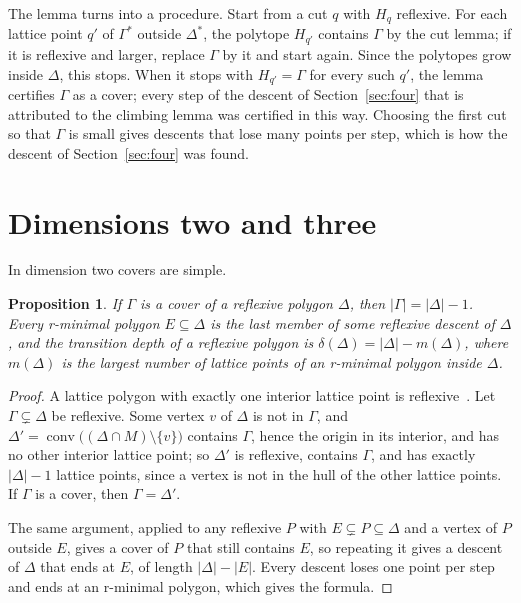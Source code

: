 \documentclass[11pt]{amsart}
\newtheorem{proposition}[theorem]{Proposition}
\theoremstyle{definition}
\theoremstyle{remark}
\newcommand{\conv}{\operatorname{conv}}
\begin{document}
The lemma turns into a procedure. Start from a cut $q$ with $H_q$
reflexive. For each lattice point $q'$ of $\Gamma^*$ outside $\Delta^*$,
the polytope $H_{q'}$ contains $\Gamma$ by the cut lemma; if it is
reflexive and larger, replace $\Gamma$ by it and start again. Since the
polytopes grow inside $\Delta$, this stops. When it stops with
$H_{q'}=\Gamma$ for every such $q'$, the lemma certifies $\Gamma$ as a
cover; every step of the descent of Section~\ref{sec:four} that is
attributed to the climbing lemma was certified in this way. Choosing the first cut so that $\Gamma$ is small
gives descents that lose many points per step, which is how the descent
of Section~\ref{sec:four} was found.

\section{Dimensions two and three}\label{sec:low}

In dimension two covers are simple.

\begin{proposition}\label{prop:twod}
If $\Gamma$ is a cover of a reflexive polygon $\Delta$, then
$|\Gamma|=|\Delta|-1$. Every r-minimal polygon $E\subseteq\Delta$ is the
last member of some reflexive descent of $\Delta$, and the transition depth
of a reflexive polygon is $\delta(\Delta)=|\Delta|-m(\Delta)$, where
$m(\Delta)$ is the largest number of lattice points of an r-minimal polygon
inside $\Delta$.
\end{proposition}

\begin{proof}
A lattice polygon with exactly one interior lattice point is
reflexive~\cite{PRV00}. Let $\Gamma\subsetneq\Delta$ be reflexive. Some
vertex $v$ of $\Delta$ is not in $\Gamma$, and
$\Delta'=\conv\bigl((\Delta\cap M)\setminus\{v\}\bigr)$ contains $\Gamma$,
hence the origin in its interior, and has no other interior lattice point;
so $\Delta'$ is reflexive, contains $\Gamma$, and has exactly
$|\Delta|-1$ lattice points, since a vertex is not in the hull of the
other lattice points. If $\Gamma$ is a cover, then $\Gamma=\Delta'$.

The same argument, applied to any reflexive $P$ with $E\subsetneq
P\subseteq\Delta$ and a vertex of $P$ outside $E$, gives a cover of $P$
that still contains $E$, so repeating it gives a descent of $\Delta$ that
ends at $E$, of length $|\Delta|-|E|$. Every descent loses one point per
step and ends at an r-minimal polygon, which gives the formula.
\end{proof}
\end{document}

